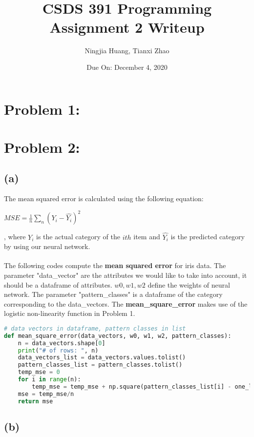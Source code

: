 \documentclass[12pt]{article}
\begin{document}
\title{CSDS 391 Programming Assignment 2 Writeup}
\author{Ningjia Huang, Tianxi Zhao}
\date{Due On: December 4, 2020}
\maketitle

\section*{Problem 1: }

\section*{Problem 2: }
\subsection*{(a)}
The mean squared error is calculated using the following equation: 
\begin{center}
    $MSE = \frac{1}{n}\sum_n (Y_i - \hat{Y_i})^2$
\end{center}
, where $Y_i$ is the actual category of the $ith$ item and $\hat{Y_i}$ is the predicted category by using our neural network.\\ \\
The following codes compute the \textbf{mean squared error} for iris data. The parameter "data\_vector" are the attributes we would like to take into account, it should be a dataframe of attributes.
$w0, w1, w2$ define the weights of neural network. The parameter "pattern\_classes" is a dataframe of the category corresponding to the data\_vectors. The \textbf{mean\_square\_error} makes use of 
the logistic non-linearity function in Problem 1.
\begin{lstlisting}[language=Python, caption=Mean Squared Error Calculation]
# data vectors in dataframe, pattern classes in list
def mean_square_error(data_vectors, w0, w1, w2, pattern_classes):
    n = data_vectors.shape[0]
    print("# of rows: ", n)
    data_vectors_list = data_vectors.values.tolist()
    pattern_classes_list = pattern_classes.tolist()
    temp_mse = 0
    for i in range(n):
        temp_mse = temp_mse + np.square(pattern_classes_list[i] - one_layer_network(w0, w1, w2, data_vectors_list[i][0], data_vectors_list[i][1]))
    mse = temp_mse/n
    return mse
\end{lstlisting}

\subsection*{(b)}
\end{document}
